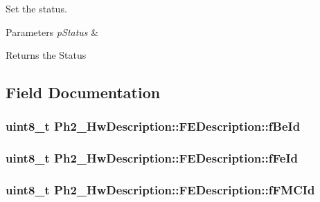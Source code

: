 Set the status. 


\begin{DoxyParams}{Parameters}
{\em p\-Status} & \\
\hline
\end{DoxyParams}
\begin{DoxyReturn}{Returns}
the Status 
\end{DoxyReturn}


\subsection{Field Documentation}
\hypertarget{class_ph2___hw_description_1_1_f_e_description_ab279589109fe8a83ecd7cd6c631394b3}{
\subsubsection[{f\-Be\-Id}]{\setlength{\rightskip}{0pt plus 5cm}uint8\-\_\-t Ph2\-\_\-\-Hw\-Description\-::\-F\-E\-Description\-::f\-Be\-Id}}\label{class_ph2___hw_description_1_1_f_e_description_ab279589109fe8a83ecd7cd6c631394b3}
\hypertarget{class_ph2___hw_description_1_1_f_e_description_a3a1a3a8323484b1bfc1a4ab3d7a59a31}{
\subsubsection[{f\-Fe\-Id}]{\setlength{\rightskip}{0pt plus 5cm}uint8\-\_\-t Ph2\-\_\-\-Hw\-Description\-::\-F\-E\-Description\-::f\-Fe\-Id}}\label{class_ph2___hw_description_1_1_f_e_description_a3a1a3a8323484b1bfc1a4ab3d7a59a31}
\hypertarget{class_ph2___hw_description_1_1_f_e_description_a7740e5ec6ae04ee47ac3081ff57e1946}{
\subsubsection[{f\-F\-M\-C\-Id}]{\setlength{\rightskip}{0pt plus 5cm}uint8\-\_\-t Ph2\-\_\-\-Hw\-Description\-::\-F\-E\-Description\-::f\-F\-M\-C\-Id}}\label{class_ph2___hw_description_1_1_f_e_description_a7740e5ec6ae04ee47ac3081ff57e1946}
